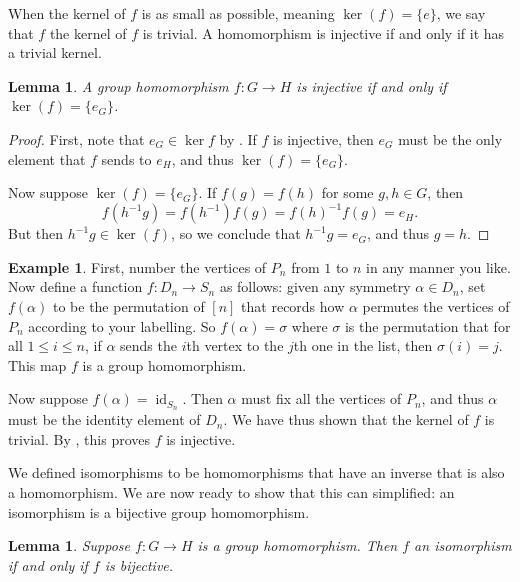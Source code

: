\documentclass[12pt]{report}
\newtheorem{lemma}[theorem]{Lemma}
\numberwithin{equation}{section}
\numberwithin{theorem}{chapter}
\theoremstyle{definition}
\newtheorem{example}[theorem]{Example}
\newtheorem*{basic properties}{Basic Properties}
\newtheorem*{Important Remark}{Important Remark}
\renewcommand{\ker}{\operatorname{ker}}
\DeclareMathOperator{\id}{id}
\begin{document}
When the kernel of $f$ is as small as possible, meaning $\ker (f) = \{ e \}$, we say that $f$ the kernel of $f$ is trivial.
A homomorphism is injective if and only if it has a trivial kernel.

\begin{lemma}\label{injective homomorphism iff ker trivial}
A group homomorphism $f: G \to H$ is injective if and only if $\ker(f) = \{e_G\}$.
\end{lemma}

\begin{proof} 
First, note that $e_G \in \ker f$ by . If $f$ is injective, then $e_G$ must be the only element that $f$ sends to $e_H$, and thus $\ker(f) = \{ e_G \}$.
 
Now suppose $\ker(f) = \{e_G\}$. If $f(g) = f(h)$ for some $g,h \in G$, then 
$$f(h^{-1}g) = f(h^{-1})f(g) = f(h)^{-1}f(g) = e_H.$$
But then $h^{-1}g \in \ker(f)$, so we conclude that $h^{-1}g = e_G$, and thus $g = h$.
\end{proof}



\begin{example} 
First, number the vertices of $P_n$ from $1$ to $n$ in any manner you like. Now define a function $f\!: D_{n} \to S_n$ as follows: given any symmetry $\alpha \in D_n$, set $f(\alpha)$ to be the permutation of $[n]$ that records how $\alpha$ permutes the vertices of $P_n$ according to your labelling. So $f(\alpha) = \sigma$ where $\sigma$ is the permutation that for all $1 \leqslant i \leqslant n$, if $\alpha$ sends the $i$th vertex to the $j$th one in the list, then $\sigma(i) = j$.
This map $f$ is a group homomorphism. 

Now suppose $f(\alpha) = \id_{S_n}$. Then $\alpha$ must fix all the vertices of $P_n$, and thus $\alpha$ must be the identity element of $D_n$. We have thus shown that the kernel of $f$ is trivial. By , this proves $f$ is injective.
\end{example}


We defined isomorphisms to be homomorphisms that have an inverse that is also a homomorphism. We are now ready to show that this can simplified: an isomorphism is a bijective group homomorphism.


\newpage

\begin{lemma}\label{iso def}
 Suppose $f\!: G \to H$ is a group homomorphism. Then $f$ an isomorphism if and only if $f$ is bijective.
\end{lemma}
\end{document}
